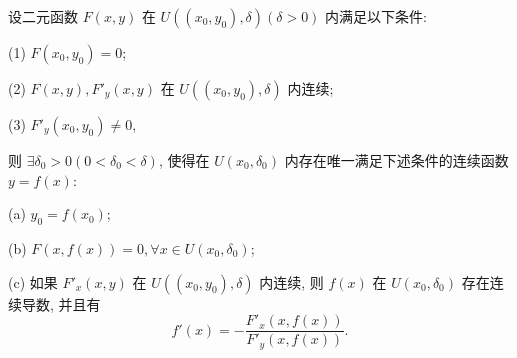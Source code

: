 \documentclass[UTF8,12pt,a4paper,fontset=fandol]{ctexart}
\begin{document}
\begin{theorem}[隐函数存在定理]\label{course-theorem-14-4-1}\quad 设二元函数 $F(x,y)$ 在 $U((x_0,y_0),\delta)(\delta>0)$ 内满足以下条件:

(1) $F(x_0,y_0)=0$;

(2) $F(x,y),F'_y(x,y)$ 在 $U((x_0,y_0),\delta)$ 内连续;

(3) $F'_y(x_0,y_0)\ne0$,

则 $\exists\delta_0>0(0<\delta_0<\delta)$, 使得在 $U(x_0,\delta_0)$ 内存在唯一满足下述条件的连续函数 $y=f(x)$:

(a) $y_0=f(x_0)$;

(b) $F(x,f(x))=0,\forall x\in U(x_0,\delta_0)$;

(c) 如果 $F'_x(x,y)$ 在 $U((x_0,y_0),\delta)$ 内连续, 则 $f(x)$ 在 $U(x_0,\delta_0)$ 存在连续导数, 并且有
\[
  f'(x)=-\frac{F'_x(x,f(x))}{F'_y(x,f(x))}.
\]

\end{theorem}
\end{document}
